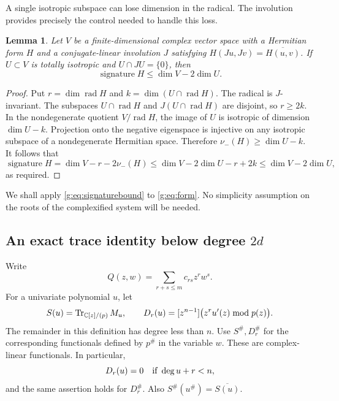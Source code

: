 \documentclass[UTF8,11pt]{ctexart}
\newtheorem{lem}[thm]{Lemma}
\theoremstyle{definition}
\numberwithin{equation}{section}
\newcommand{\C}{\mathbb C}\newcommand{\R}{\mathbb R}
\DeclareMathOperator{\rad}{rad}\DeclareMathOperator{\spanC}{span_{\C}}
\begin{document}
A single isotropic subspace can lose dimension in the radical. The
involution provides precisely the control needed to handle this loss.
\begin{lem}\label{g:lem:isotropic}
Let $V$ be a finite-dimensional complex vector space with a Hermitian form
$H$ and a conjugate-linear involution $J$ satisfying
$H(Ju,Jv)=\overline{H(u,v)}$. If $U\subset V$ is totally isotropic and
$U\cap JU=\{0\}$, then
\begin{equation}\label{g:eq:signaturebound}
 \operatorname{signature}H\le \dim V-2\dim U.
\end{equation}
\end{lem}
\begin{proof}
Put $r=\dim\rad H$ and $k=\dim(U\cap\rad H)$. The radical is $J$-invariant.
The subspaces $U\cap\rad H$ and $J(U\cap\rad H)$ are disjoint, so $r\ge2k$.
In the nondegenerate quotient $V/\rad H$, the image of $U$ is isotropic of
dimension $\dim U-k$. Projection onto the negative eigenspace is injective
on any isotropic subspace of a nondegenerate Hermitian space. Therefore
$\nu_-(H)\ge\dim U-k$. It follows that
\[
 \operatorname{signature}H
 =\dim V-r-2\nu_-(H)
 \le\dim V-2\dim U-r+2k
 \le\dim V-2\dim U,
\]
as required.
\end{proof}

We shall apply \eqref{g:eq:signaturebound} to \eqref{g:eq:form}. No simplicity
assumption on the roots of the complexified system will be needed.

\subsection{An exact trace identity below degree \texorpdfstring{$2d$}{2d}}
Write
\[
 Q(z,w)=\sum_{r+s\le m}c_{rs}z^rw^s.
\]
For a univariate polynomial $u$, let
\[
 S(u)=\Tr_{\C[z]/(p)} M_u,
 \qquad
 D_r(u)=[z^{n-1}]\bigl(z^ru'(z)\bmod p(z)\bigr).
\]
The remainder in this definition has degree less than $n$. Use
$S^\#,D_r^\#$ for the corresponding functionals defined by $p^\#$ in the
variable $w$. These are complex-linear functionals. In particular,
\begin{equation}\label{g:eq:Dvanish}
 D_r(u)=0\quad\hbox{if }\deg u+r<n,
\end{equation}
and the same assertion holds for $D_r^\#$. Also
$S^\#(u^\#)=\overline{S(u)}$.
\end{document}
